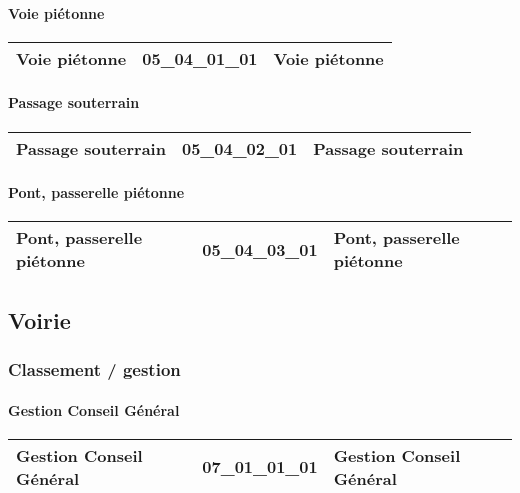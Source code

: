 \documentclass[12pt,titlepage,oneside]{book}
\begin{document}
\paragraph{Voie piétonne}
\noindent
\vspace{\baselineskip}

\renewcommand{\arraystretch}{1.2}
\begin{supertabular}{|p{10cm}|c|p{15cm}|}
 Voie piétonne & 05\_04\_01\_01 & Voie piétonne\\
\hline
\end{supertabular}


\paragraph{Passage souterrain}
\noindent
\vspace{\baselineskip}

\renewcommand{\arraystretch}{1.2}
\begin{supertabular}{|p{10cm}|c|p{15cm}|}
 Passage souterrain & 05\_04\_02\_01 & Passage souterrain\\
\hline
\end{supertabular}


\paragraph{Pont, passerelle piétonne}
\noindent
\vspace{\baselineskip}

\renewcommand{\arraystretch}{1.2}
\begin{supertabular}{|p{10cm}|c|p{15cm}|}
 Pont, passerelle piétonne & 05\_04\_03\_01 & Pont, passerelle piétonne\\
\hline
\end{supertabular}
\subsection{Voirie}
\subsubsection{\large Classement / gestion}
\paragraph{Gestion Conseil Général}
\noindent
\vspace{\baselineskip}

\renewcommand{\arraystretch}{1.2}
\begin{supertabular}{|p{10cm}|c|p{15cm}|}
 Gestion Conseil Général & 07\_01\_01\_01 & Gestion Conseil Général\\
\hline
\end{supertabular}
\end{document}
